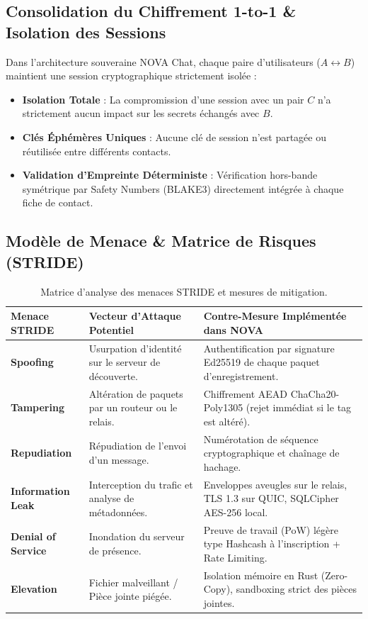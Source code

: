 \documentclass[11pt,a4paper]{article}
\begin{document}
\subsection{Consolidation du Chiffrement 1-to-1 \& Isolation des Sessions}
Dans l'architecture souveraine NOVA Chat, chaque paire d'utilisateurs ($A \leftrightarrow B$) maintient une session cryptographique strictement isolée :
\begin{itemize}
    \item \textbf{Isolation Totale} : La compromission d'une session avec un pair $C$ n'a strictement aucun impact sur les secrets échangés avec $B$.
    \item \textbf{Clés Éphémères Uniques} : Aucune clé de session n'est partagée ou réutilisée entre différents contacts.
    \item \textbf{Validation d'Empreinte Déterministe} : Vérification hors-bande symétrique par Safety Numbers (BLAKE3) directement intégrée à chaque fiche de contact.
\end{itemize}

\subsection{Modèle de Menace \& Matrice de Risques (STRIDE)}

\begin{table}[h!]
\centering
\small
\begin{tabularx}{\textwidth}{|l|X|X|}
\hline
\rowcolor{novasurface2!20} \textbf{Menace STRIDE} & \textbf{Vecteur d'Attaque Potentiel} & \textbf{Contre-Mesure Implémentée dans NOVA} \\ \hline
\textbf{Spoofing} & Usurpation d'identité sur le serveur de découverte. & Authentification par signature Ed25519 de chaque paquet d'enregistrement. \\ \hline
\textbf{Tampering} & Altération de paquets par un routeur ou le relais. & Chiffrement AEAD ChaCha20-Poly1305 (rejet immédiat si le tag est altéré). \\ \hline
\textbf{Repudiation} & Répudiation de l'envoi d'un message. & Numérotation de séquence cryptographique et chaînage de hachage. \\ \hline
\textbf{Information Leak} & Interception du trafic et analyse de métadonnées. & Enveloppes aveugles sur le relais, TLS 1.3 sur QUIC, SQLCipher AES-256 local. \\ \hline
\textbf{Denial of Service} & Inondation du serveur de présence. & Preuve de travail (PoW) légère type Hashcash à l'inscription + Rate Limiting. \\ \hline
\textbf{Elevation} & Fichier malveillant / Pièce jointe piégée. & Isolation mémoire en Rust (Zero-Copy), sandboxing strict des pièces jointes. \\ \hline
\end{tabularx}
\caption{Matrice d'analyse des menaces STRIDE et mesures de mitigation.}
\end{table}
\end{document}
